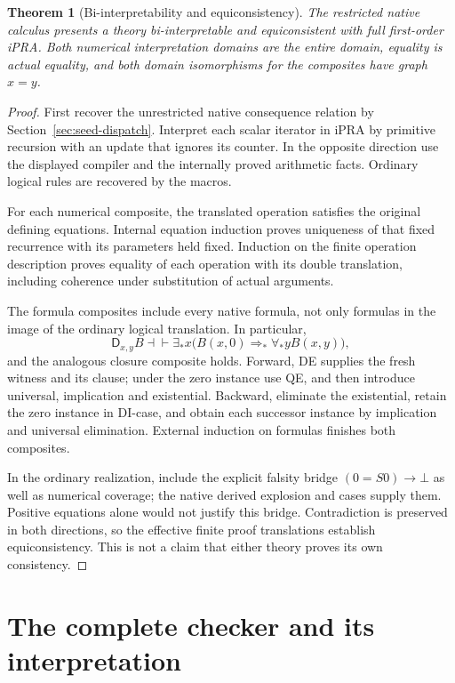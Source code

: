 \documentclass[11pt,letterpaper]{article}
\newtheorem{theorem}{Theorem}[section]
\theoremstyle{definition}\newtheorem{definition}[theorem]{Definition}
\theoremstyle{remark}\newtheorem{remark}[theorem]{Remark}
\newcommand{\D}{\mathsf D}
\begin{document}
\begin{theorem}[Bi-interpretability and equiconsistency]
The restricted native calculus presents a theory bi-interpretable and
equiconsistent with full first-order iPRA. Both numerical interpretation
domains are the entire domain, equality is actual equality, and both
domain isomorphisms for the composites have graph $x=y$.
\end{theorem}
\begin{proof}
First recover the unrestricted native consequence relation by
Section~\ref{sec:seed-dispatch}. Interpret each scalar iterator in iPRA
by primitive recursion with an update that ignores its counter. In the
opposite direction use the displayed compiler and the internally proved
arithmetic facts. Ordinary logical rules are recovered by the macros.

For each numerical composite, the translated operation satisfies the
original defining equations. Internal equation induction proves
uniqueness of that fixed recurrence with its parameters held fixed.
Induction on the finite operation description proves equality of each
operation with its double translation, including coherence under
substitution of actual arguments.

The formula composites include every native formula, not only formulas
in the image of the ordinary logical translation. In particular,
\[
 \D_{x,y}B\dashv\vdash
 \exists_*x\bigl(B(x,0)\Rightarrow_*\forall_*yB(x,y)\bigr),
\]
and the analogous closure composite holds. Forward, DE supplies the
fresh witness and its clause; under the zero instance use QE, and then
introduce universal, implication and existential. Backward, eliminate
the existential, retain the zero instance in DI-case, and obtain each
successor instance by implication and universal elimination. External
induction on formulas finishes both composites.

In the ordinary realization, include the explicit falsity bridge
$(0=S0)\to\bot$ as well as numerical coverage; the native derived
explosion and cases supply them. Positive equations alone would not
justify this bridge. Contradiction is preserved in both directions, so
the effective finite proof translations establish equiconsistency.
This is not a claim that either theory proves its own consistency.
\end{proof}


\section{The complete checker and its interpretation}
\label{sec:checker}
\end{document}
